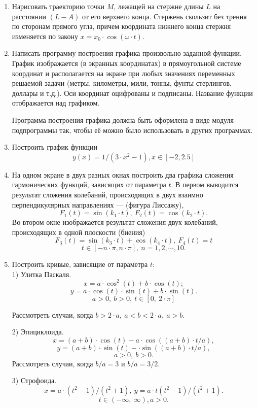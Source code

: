 \begin{enumerate}
\item Нарисовать траекторию точки $M$, лежащей на стержне длины $L$ на расстоянии $(L- A)$ от его верхнего конца. Стержень скользит без трения по сторонам прямого угла, причем координата нижнего конца стержня изменяется по закону $x = x_0\cdot\cos(\omega\cdot t)$.

\item Написать программу построения графика произвольно заданной функции. График изображается (в экранных координатах) в прямоугольной системе координат и располагается на экране при любых значениях переменных решаемой задачи (метры, километры, мили, тонны, фунты стерлингов, доллары и т.д.). Оси координат оцифрованы и подписаны. Название функции отображается над графиком.

Программа построения графика должна быть оформлена в виде модуля-подпрограммы так, чтобы её можно было использовать в других программах.

\item Построить график функции
$$y(x)= 1/(3\cdot x^2-1), x \in[-2,2.5]$$

\item На одном экране в двух разных окнах построить два графика сложения гармонических функций, зависящих от параметра $t$. В первом выводится результат сложения колебаний, происходящих в двух взаимно перпендикулярных направлениях --- (фигура Лиссажу),
$$F_1(t) = \sin(k_1\cdot t), \:F_2(t) = \cos(k_2\cdot t).$$
Во втором окне изображается результат сложения двух колебаний, происходящих в одной плоскости (биения)
$$F_3(t) = \sin(k_3\cdot t) + \cos(k_4\cdot t), \:F_4(t) = t$$
$$t\in [-n\cdot \pi, n\cdot \pi], \:n = 1,2,\cdots, 10.  $$

\item   Построить кривые, зависящие от параметра $t:$\\

 1) Улитка Паскаля.\\
$$x = a\cdot \cos^2(t) + b\cdot \cos(t);$$
$$ y = a\cdot \cos(t)\cdot\sin(t) + b\cdot\sin(t).$$
$$a > 0, \:b > 0,\: t \in[0,\:2\cdot \pi]$$

Рассмотреть случаи, когда $b > 2\cdot a, \: a < b < 2\cdot a, \: a > b.$

2) Эпициклоида.\\
$$x = (a + b)\cdot\cos(t) - a\cdot\cos((a + b)\cdot t / a),$$
$$y = (a + b)\cdot\sin(t) - \cdot\sin((a + b)\cdot t / a), $$
$$a > 0,\: b > 0.$$
Рассмотреть случаи, когда $b / a = 3$ и $b / a = 3 / 2.$

3) Строфоида.\\
$$x = a\cdot(t^2 -1)/(t^2 + 1), \:y = a\cdot t(t^2-1) / (t^2 +1).$$
$$ t \in (-\infty ,\:\infty),  a > 0.$$


\end{enumerate}
